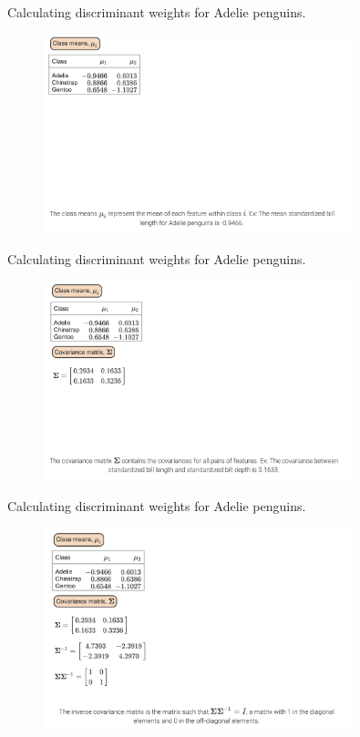 \documentclass[10pt,dvipsnames]{beamer}
\begin{document}
\begin{frame}{Calculating discriminant weights for Adelie penguins.}
	\begin{figure}[ht]
		\centering
		\includegraphics[width=0.8\textwidth]{imgs/df_5.png}
	\end{figure}
\end{frame}

\begin{frame}{Calculating discriminant weights for Adelie penguins.}
	\begin{figure}[ht]
		\centering
		\includegraphics[width=0.8\textwidth]{imgs/df_6.png}
	\end{figure}
\end{frame}

\begin{frame}{Calculating discriminant weights for Adelie penguins.}
	\begin{figure}[ht]
		\centering
		\includegraphics[width=0.8\textwidth]{imgs/df_7.png}
	\end{figure}
\end{frame}
\end{document}
